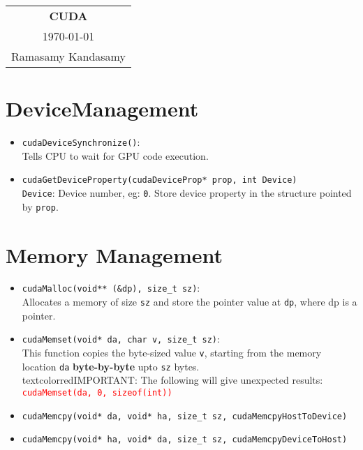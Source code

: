 



\raggedright
\footnotesize
\begin{multicols*}{3}
\setlength{\premulticols}{1pt}
\setlength{\postmulticols}{1pt}
\setlength{\multicolsep}{1pt}
\setlength{\columnsep}{2pt}

\begin{center}
\begin{tabular}{c}
\LARGE{\textbf{CUDA}}\\
\today\\
Ramasamy Kandasamy\\
\end{tabular}
\end{center}


\section*{DeviceManagement}

\begin{itemize}
	\item \texttt{cudaDeviceSynchronize()}: \\
    Tells CPU to wait for GPU code execution.
    \item \texttt{cudaGetDeviceProperty(cudaDeviceProp* prop, int Device)}\\
    \texttt{Device}: Device number, eg: \texttt{0}. Store device property in the structure pointed by \texttt{prop}. 
\end{itemize}

\section*{Memory Management}

\begin{itemize}
	\item \texttt{cudaMalloc(void** (\&dp), size\_t sz)}:\\
    Allocates a memory of size \texttt{sz} and store the pointer value at \texttt{dp}, where dp is a pointer.
    \item \texttt{cudaMemset(void* da, char v, size\_t sz)}:\\
    This function copies the byte-sized value \texttt{v}, starting from the memory location \texttt{da} \textbf{byte-by-byte} upto \texttt{sz} bytes.\\
    textcolor{red}{IMPORTANT:} The following will give unexpected results:\\
    \textcolor{red}{\texttt{cudaMemset(da, 0, sizeof(int))}}
    \item \texttt{cudaMemcpy(void* da, void* ha, size\_t sz, cudaMemcpyHostToDevice)}\\
    \item \texttt{cudaMemcpy(void* ha, void* da, size\_t sz, cudaMemcpyDeviceToHost)}\\
\end{itemize}


\end{multicols*}
